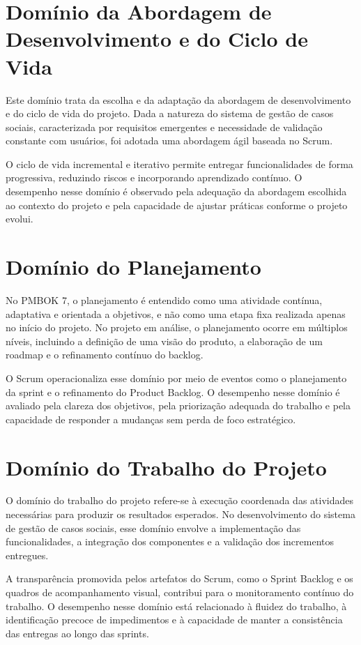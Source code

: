 \section{Domínio da Abordagem de Desenvolvimento e do Ciclo de Vida}

Este domínio trata da escolha e da adaptação da abordagem de desenvolvimento e do ciclo de vida do projeto. Dada a natureza do sistema de gestão de casos sociais, caracterizada por requisitos emergentes e necessidade de validação constante com usuários, foi adotada uma abordagem ágil baseada no Scrum.

O ciclo de vida incremental e iterativo permite entregar funcionalidades de forma progressiva, reduzindo riscos e incorporando aprendizado contínuo. O desempenho nesse domínio é observado pela adequação da abordagem escolhida ao contexto do projeto e pela capacidade de ajustar práticas conforme o projeto evolui.

\section{Domínio do Planejamento}

No PMBOK 7, o planejamento é entendido como uma atividade contínua, adaptativa e orientada a objetivos, e não como uma etapa fixa realizada apenas no início do projeto. No projeto em análise, o planejamento ocorre em múltiplos níveis, incluindo a definição de uma visão do produto, a elaboração de um roadmap e o refinamento contínuo do backlog.

O Scrum operacionaliza esse domínio por meio de eventos como o planejamento da sprint e o refinamento do Product Backlog. O desempenho nesse domínio é avaliado pela clareza dos objetivos, pela priorização adequada do trabalho e pela capacidade de responder a mudanças sem perda de foco estratégico.

\section{Domínio do Trabalho do Projeto}

O domínio do trabalho do projeto refere-se à execução coordenada das atividades necessárias para produzir os resultados esperados. No desenvolvimento do sistema de gestão de casos sociais, esse domínio envolve a implementação das funcionalidades, a integração dos componentes e a validação dos incrementos entregues.

A transparência promovida pelos artefatos do Scrum, como o Sprint Backlog e os quadros de acompanhamento visual, contribui para o monitoramento contínuo do trabalho. O desempenho nesse domínio está relacionado à fluidez do trabalho, à identificação precoce de impedimentos e à capacidade de manter a consistência das entregas ao longo das sprints.

